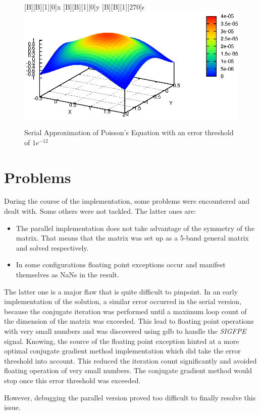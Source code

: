\documentclass[12pt,a4paper]{report}
\begin{document}
\begin{figure}[htb]
  \centering
  [B][B][1][0]{x}
  [B][B][1][0]{y}
  [B][B][1][270]{$\epsilon$}
  \includegraphics{./images/poiss_1e-12.eps}
  \caption{Serial Approximation of Poisson's Equation with an error
    threshold of $1e^{-12}$}
  \label{fig:approxPoissSerial}
\end{figure}

\chapter{Problems}
\label{cha:problems}

During the course of the implementation, some problems were
encountered and dealt with. Some others were not tackled. The latter
ones are:

\begin{itemize}
\item The parallel implementation does not take advantage of the
  symmetry of the matrix. That means that the matrix was set up as a
  5-band general matrix and solved respectively.
\item In some configurations floating point exceptions occur and
  manifest themselves as NaNs in the result.
\end{itemize}

The latter one is a major flaw that is quite difficult to
pinpoint. In an early implementation of the solution, a similar error
occurred in the serial version, because the conjugate iteration was
performed until a maximum loop count of the dimension of the matrix
was exceeded. This lead to floating point operations with very small
numbers and was discovered using gdb to handle the \textit{SIGFPE}
signal. Knowing, the source of the floating point exception hinted at
a more optimal conjugate gradient method implementation which did take
the error threshold into account. This reduced the iteration count
significantly and avoided floating operation of very small
numbers. The conjugate gradient method would stop once this error
threshold was exceeded.

However, debugging the parallel version proved too difficult to
finally resolve this issue.
\end{document}
